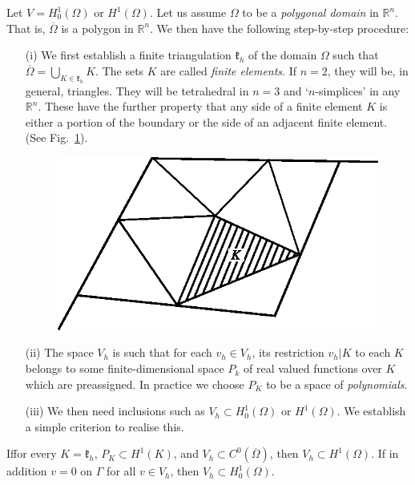 Let $V=H^{1}_{0}(\Omega)$ or $H^{1}(\Omega)$. Let us assume $\Omega$
to be a {\em polygonal domain} in $\mathbb{R}^{n}$. That is,
$\overline{\Omega}$ is a polygon in $\mathbb{R}^{n}$. We then have the
following step-by-step procedure:
\begin{itemize}
\item[(i)] We first establish a finite triangulation $\mathfrak{k}_{h}$ of the
domain $\Omega$ such that
$\overline{\Omega}=\bigcup\limits_{K\in\mathfrak{k}_{h}}K$. The sets
$K$ are called {\em finite elements}. If $n=2$, they will be, in
general, triangles. They will be tetrahedral in $n=3$ and
`$n$-simplices' in any $\mathbb{R}^{n}$. These have the further
property that any side of a finite element $K$ is either a portion of
the boundary or the side of an adjacent finite element. (See
Fig.~\ref{chap3-fig3.1}). 
\begin{figure}[H]
\centering
\includegraphics{figure/fig3.1.eps}
\caption{}\label{chap3-fig3.1}
\end{figure}

\item[(ii)] The space $V_{h}$ is such that for each $v_{h}\in V_{h}$,
  its restriction $v_{h}|K$ to each $K$ belongs to some
  finite-dimensional space $P_{k}$ of real valued functions over $K$
  which are preassigned. In practice we choose $P_{K}$ to be a space
  of {\em polynomials}.

\item[(iii)] We then need inclusions such as $V_{h}\subset
  H^{1}_{0}(\Omega)$ or $H^{1}(\Omega)$. We establish a simple
  criterion to realise this.
\end{itemize}

\begin{theorem}\label{chap3-thm3.2}
If\pageoriginale for every $K=\mathfrak{k}_{h}$, $P_{K}\subset
H^{1}(K)$, and $V_{h}\subset C^{0}(\overline{\Omega})$, then
$V_{h}\subset H^{1}(\Omega)$. If in addition $v=0$ on $\Gamma$ for all
$v\in V_{h}$, then $V_{h}\subset H^{1}_{0}(\Omega)$.
\end{theorem}

